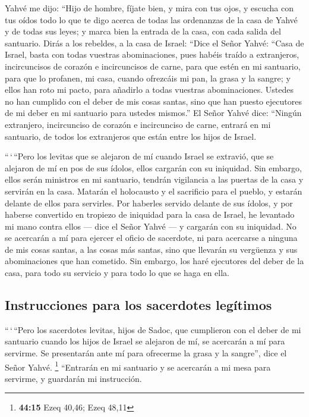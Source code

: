 \begin{paracol}{2}
 Yahvé me dijo: ``Hijo de hombre, fíjate bien, y mira con
tus ojos, y escucha con tus oídos todo lo que te digo acerca de todas
las ordenanzas de la casa de Yahvé y de todas sus leyes; y marca bien la
entrada de la casa, con cada salida del santuario.  Dirás
a los rebeldes, a la casa de Israel: ``Dice el Señor Yahvé: ``Casa de
Israel, basta con todas vuestras abominaciones,  pues
habéis traído a extranjeros, incircuncisos de corazón e incircuncisos de
carne, para que estén en mi santuario, para que lo profanen, mi casa,
cuando ofrezcáis mi pan, la grasa y la sangre; y ellos han roto mi
pacto, para añadirlo a todas vuestras abominaciones. 
Ustedes no han cumplido con el deber de mis cosas santas, sino que han
puesto ejecutores de mi deber en mi santuario para ustedes mismos.''
 El Señor Yahvé dice: ``Ningún extranjero, incircunciso de
corazón e incircunciso de carne, entrará en mi santuario, de todos los
extranjeros que están entre los hijos de Israel.

 ``\,`\,``Pero los levitas que se alejaron de mí cuando
Israel se extravió, que se alejaron de mí en pos de sus ídolos, ellos
cargarán con su iniquidad.  Sin embargo, ellos serán
ministros en mi santuario, tendrán vigilancia a las puertas de la casa y
servirán en la casa. Matarán el holocausto y el sacrificio para el
pueblo, y estarán delante de ellos para servirles.  Por
haberles servido delante de sus ídolos, y por haberse convertido en
tropiezo de iniquidad para la casa de Israel, he levantado mi mano
contra ellos --- dice el Señor Yahvé --- y cargarán con su iniquidad.
 No se acercarán a mí para ejercer el oficio de
sacerdote, ni para acercarse a ninguna de mis cosas santas, a las cosas
más santas, sino que llevarán su vergüenza y sus abominaciones que han
cometido.  Sin embargo, los haré ejecutores del deber de
la casa, para todo su servicio y para todo lo que se haga en ella.

\hypertarget{instrucciones-para-los-sacerdotes-leguxedtimos}{%
\subsection{Instrucciones para los sacerdotes
legítimos}\label{instrucciones-para-los-sacerdotes-leguxedtimos}}

 ``\,`\,``Pero los sacerdotes levitas, hijos de Sadoc,
que cumplieron con el deber de mi santuario cuando los hijos de Israel
se alejaron de mí, se acercarán a mí para servirme. Se presentarán ante
mí para ofrecerme la grasa y la sangre'', dice el Señor Yahvé.
\footnote{\textbf{44:15} Ezeq 40,46; Ezeq 48,11} 
``Entrarán en mi santuario y se acercarán a mi mesa para servirme, y
guardarán mi instrucción.


\end{paracol}
